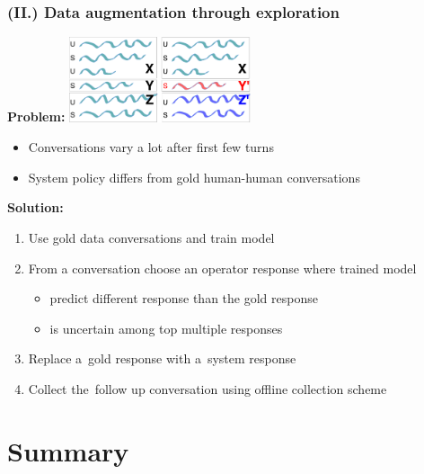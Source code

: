 \documentclass[10pt, compress,british,xcolor={svgnames,dvipsnames,x11names},trans]{beamer}
\begin{document}
\begin{frame}\frametitle{(II.) Data augmentation through exploration}
    {\bf Problem:} \hfill \includegraphics[width=0.4\textwidth]{./misunderstaning}
    \begin{itemize}
        \item Conversations vary a lot after first few turns
        \item System policy differs from gold human-human conversations
    \end{itemize}
    {\bf Solution:} \\
    \begin{enumerate}
        \item Use gold data conversations and train model   
        \item From a conversation choose an operator response where trained model
            \begin{itemize}
                \item predict different response than the gold response
                \item is uncertain among top multiple responses
            \end{itemize}
        \item Replace a~gold response with a~system response
        \item Collect the~follow up conversation using offline collection scheme  
    \end{enumerate}
\end{frame}

\section{Summary}
\end{document}
